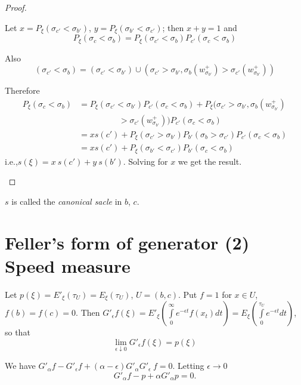 \begin{proof}
\begin{itemize}
Let $x = P_{\xi} (\sigma_{c'} < \sigma_{b'})$, $y= P_\xi (\sigma_{b'} <
\sigma_{c'})$; then $x+y=1$ and  
$$
P_{\xi} (\sigma_c < \sigma_b) = P_\xi (\sigma_{c'} < \sigma _b) P_{c'}
(\sigma_c < \sigma_b) 
$$ 

Also 
$$
(\sigma_{c'} < \sigma_b) = (\sigma_{c'} < \sigma_{b'}) \cup
(\sigma_{c'} > \sigma_{b'}, \sigma_b (w^+_{\sigma_{b'}}) >
\sigma_{c'} (w^+_{\sigma_{b'}}))
$$ 

Therefore\pageoriginale 
\begin{align*}
P_\xi (\sigma_c < \sigma_b) & = P_\xi (\sigma_{c'} <
  \sigma_{b'}) P_{c'} (\sigma_c < \sigma_b)+ P_\xi (\sigma_{c'} > \sigma
  _{b'} , \sigma_b (w^+_{\sigma_{b'}})\\ 
  & \hspace{2cm} > \sigma_{c'} (w^+
  _{\sigma_{b'}})) P_{c'} (\sigma_c < \sigma _b) \\
  &= x s(c') + P_\xi (\sigma_{c'} > \sigma_{b'}) P_{b'} (\sigma_b >
  \sigma_{c'}) P_{c'} (\sigma_c < \sigma_b)\\ 
  &= x s(c') + P_\xi (\sigma_{b'} < \sigma_{c'}) P_{b'} (\sigma_c < \sigma_b)
\end{align*}
i.e.,\qquad $s(\xi) = x ~ s(c') + y ~ s(b')$. 
Solving for $x$ we get the result.
\end{itemize}
\end{proof}

\begin{defi*}
 $s$ is called the {\em canonical sacle} in $b$, $c$.
\end{defi*}

\section{Feller's form of generator (2) Speed
  measure}\label{chap6-sec5} %

Let $p(\xi) = E'_\xi (\tau_U) = E_\xi (\tau_U)$, $U = (b, c)$. Put $f=1$
for $x \in U$, $f (b) = f(c) =0$. Then $G'_\epsilon f (\xi)=E'_{\xi}
\left(\int\limits^{\infty}_{0} e^{- \epsilon t} f(x_t)dt\right) = E_\xi
\left(\int\limits^{\tau_U}_{0} e^{- \epsilon t} dt\right)$, so that  
$$
\lim\limits_{\epsilon \downarrow 0} G'_\epsilon f(\xi) = p(\xi)
$$

We have $G'_\alpha f - G'_\epsilon f + (\alpha - \epsilon) G'_\alpha
G'_{\epsilon} ~ f = 0$. Letting $\epsilon \to 0$  
$$
G'_\alpha f - p + \alpha G'_\alpha p = 0.
$$

